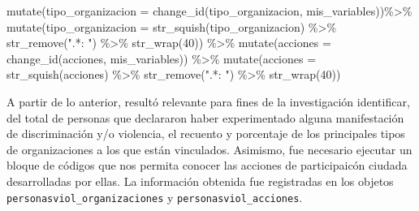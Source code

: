 \documentclass[
]{book}
\newenvironment{Shaded}{\begin{snugshade}}{\end{snugshade}}
\newcommand{\AttributeTok}[1]{\textcolor[rgb]{0.77,0.63,0.00}{#1}}
\newcommand{\DecValTok}[1]{\textcolor[rgb]{0.00,0.00,0.81}{#1}}
\newcommand{\FunctionTok}[1]{\textcolor[rgb]{0.00,0.00,0.00}{#1}}
\newcommand{\NormalTok}[1]{#1}
\newcommand{\SpecialCharTok}[1]{\textcolor[rgb]{0.00,0.00,0.00}{#1}}
\newcommand{\StringTok}[1]{\textcolor[rgb]{0.31,0.60,0.02}{#1}}
\theoremstyle{definition}
\theoremstyle{definition}
\theoremstyle{definition}
\theoremstyle{definition}
\theoremstyle{remark}
\begin{document}
\begin{Shaded}
\begin{Highlighting}[]
  \FunctionTok{mutate}\NormalTok{(}\AttributeTok{tipo\_organizacion =} \FunctionTok{change\_id}\NormalTok{(tipo\_organizacion, mis\_variables))}\SpecialCharTok{\%\textgreater{}\%}
  \FunctionTok{mutate}\NormalTok{(}\AttributeTok{tipo\_organizacion =} \FunctionTok{str\_squish}\NormalTok{(tipo\_organizacion) }\SpecialCharTok{\%\textgreater{}\%} \FunctionTok{str\_remove}\NormalTok{(}\StringTok{".*: "}\NormalTok{) }\SpecialCharTok{\%\textgreater{}\%} \FunctionTok{str\_wrap}\NormalTok{(}\DecValTok{40}\NormalTok{)) }\SpecialCharTok{\%\textgreater{}\%}
  \FunctionTok{mutate}\NormalTok{(}\AttributeTok{acciones =} \FunctionTok{change\_id}\NormalTok{(acciones, mis\_variables)) }\SpecialCharTok{\%\textgreater{}\%} 
  \FunctionTok{mutate}\NormalTok{(}\AttributeTok{acciones =} \FunctionTok{str\_squish}\NormalTok{(acciones) }\SpecialCharTok{\%\textgreater{}\%} \FunctionTok{str\_remove}\NormalTok{(}\StringTok{".*: "}\NormalTok{) }\SpecialCharTok{\%\textgreater{}\%} \FunctionTok{str\_wrap}\NormalTok{(}\DecValTok{40}\NormalTok{))}
\end{Highlighting}
\end{Shaded}

A partir de lo anterior, resultó relevante para fines de la investigación identificar, del total de personas que declararon haber experimentado alguna manifestación de discriminación y/o violencia, el recuento y porcentaje de los principales tipos de organizaciones a los que están vinculados. Asimismo, fue necesario ejecutar un bloque de códigos que nos permita conocer las acciones de participaicón ciudada desarrolladas por ellas. La información obtenida fue registradas en los objetos \texttt{personasviol\_organizaciones} y \texttt{personasviol\_acciones}.
\end{document}

